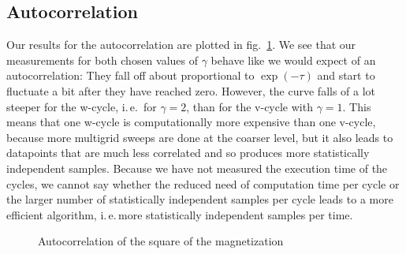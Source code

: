 \documentclass{scrartcl}
\begin{document}
\subsection{Autocorrelation}

Our results for the autocorrelation are plotted in fig.~\ref{fig:autocorrelation}. We see that our measurements for both chosen values of $\gamma$ behave like we would expect of an autocorrelation: They fall off about proportional to $\exp(-\tau)$ and start to fluctuate a bit after they have reached zero. However, the curve falls of a lot steeper for the w-cycle, i.\,e.\, for $\gamma=2$, than for the v-cycle with $\gamma=1$. This means that one w-cycle is computationally more expensive than one v-cycle, because more multigrid sweeps are done at the coarser level, but it also leads to datapoints that are much less correlated and so produces more statistically independent samples. Because we have not measured the execution time of the cycles, we cannot say whether the reduced need of computation time per cycle or the larger number of statistically independent samples per cycle leads to a more efficient algorithm, i.\,e.\,more statistically independent samples per time.
 
\begin{figure}[htbp]
	
	\caption{Autocorrelation of the square of the magnetization}
	\label{fig:autocorrelation}
\end{figure}

%

\newpage	
\listoffigures
\listoftables
\printbibliography
\end{document}
